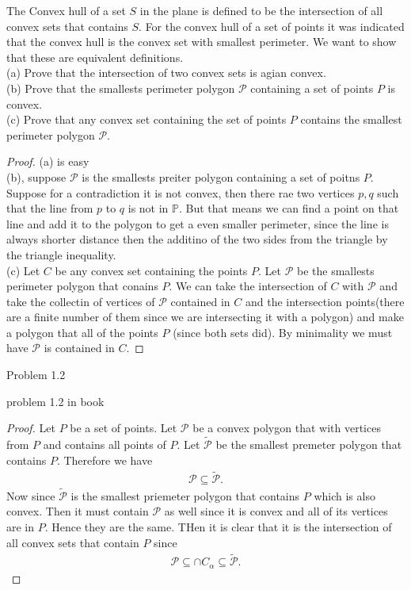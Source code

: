 \documentclass[12pt]{article}
\newcommand{\0}{\{0\}}
\newenvironment{proposition}[2][Proposition]{\begin{trivlist}
\item[\hspace \labelsep {\bfseries #1}\hspace \labelsep {\bfseries #2:}]}{\end{trivlist}}
\begin{document}
	\begin{proposition}\\
	The Convex hull of a set $S$ in the plane is defined to be the intersection of all convex sets that contains $S$.  For the convex hull of a set of points it was indicated that the convex hull is the convex set with smallest perimeter.  We want to show that these are equivalent definitions.
	\\
	(a) Prove that the intersection of two convex sets is agian convex.  
	\\
	(b) Prove that the smallests perimeter polygon $\mathcal{P}$ containing a set of points $P$ is convex.
	\\
	(c) Prove that any convex set containing the set of points $P$ contains the smallest perimeter polygon $\mathcal{P}$.
	\end{proposition}
	\begin{proof}
		(a) is easy
		\\
		(b), suppose $\mathcal{P}$ is the smallests preiter polygon containing a set of poitns $P$.  Suppose for a contradiction it is not convex, then there rae two vertices $p,q$ such that the line from $p$ to $q$ is not in $\mathbb{P}$.  But that means we can find a point on that line and add it to the polygon to get a even smaller perimeter, since the line is always shorter distance then the additino of the two sides from the triangle by the triangle inequality.
		\\
		(c) Let $C$ be any convex set containing the points $P$.  Let $\mathcal{P}$ be the smallests perimeter polygon that conains $P$.  We can take the intersection of $C$ with $\mathcal{P}$ and take the collectin of vertices of $\mathcal{P}$ contained in $C$ and the intersection points(there are a finite number of them since we are intersecting it with a polygon) and make a polygon that all of the points $P$ (since both sets did).  By minimality we must have $\mathcal{P}$ is contained in $C$.
	\end{proof}
	\indent Problem 1.2
	\begin{proposition}\\
		problem 1.2 in book
		
	\end{proposition}
	\begin{proof}
	Let $P$ be a set of points.  Let $\mathcal{P}$ be a convex polygon that with vertices from $P$ and contains all points of $P$.  Let $\widetilde{\mathcal{P}}$ be the smallest premeter polygon that contains $P$.  Therefore we have
		\begin{align*}
		\mathcal{P}\subseteq \widetilde{\mathcal{P}}.
		\end{align*}
		Now since $\widetilde{\mathcal{P}}$ is the smallest priemeter polygon that contains $P$ which is also convex.  Then it must contain $\mathcal{P}$ as well since it is convex and all of its vertices are in $P$. Hence they are the same.  THen it is clear that it is the intersection of all convex sets that contain $P$ since
		\begin{align*}
			\mathcal{P}\subseteq \cap C_{\alpha} \subseteq \widetilde{\mathcal{P}}.
		\end{align*}
	\end{proof}
\end{document}
